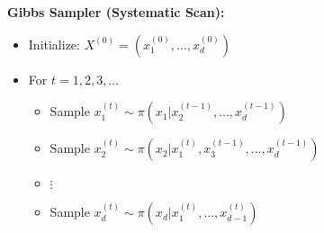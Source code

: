 \begin{frame}
\begin{columns}[t]
\begin{column}{0.48\textwidth}
\textbf{Gibbs Sampler (Systematic Scan):}
\begin{itemize}
    \item Initialize: $X^{(0)} = (x_1^{(0)}, \ldots, x_d^{(0)})$
    \item For $t = 1, 2, 3, \ldots$
    \begin{itemize}
        \item Sample $x_1^{(t)} \sim \pi(x_1 | x_2^{(t-1)}, \ldots, x_d^{(t-1)})$
        \item Sample $x_2^{(t)} \sim \pi(x_2 | x_1^{(t)}, x_3^{(t-1)}, \ldots, x_d^{(t-1)})$
        \item $\vdots$
        \item Sample $x_d^{(t)} \sim \pi(x_d | x_1^{(t)}, \ldots, x_{d-1}^{(t)})$
    \end{itemize}
\end{itemize}
\end{column}
\end{columns}
\end{frame}




